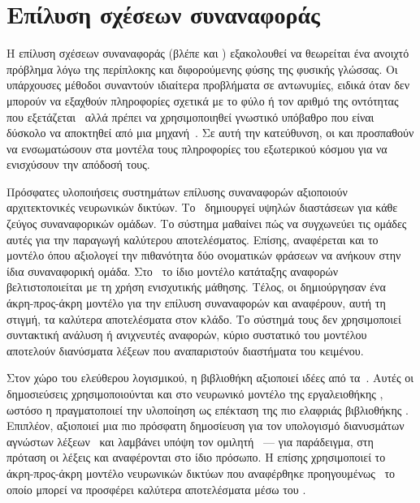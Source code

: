 \section{Επίλυση σχέσεων συναναφοράς}
Η επίλυση σχέσεων συναναφοράς (βλέπε και ) εξακολουθεί να θεωρείται ένα ανοιχτό πρόβλημα λόγω της περίπλοκης και διφορούμενης φύσης της φυσικής γλώσσας.
Οι υπάρχουσες μέθοδοι συναντούν ιδιαίτερα προβλήματα σε αντωνυμίες, ειδικά όταν δεν μπορούν να εξαχθούν πληροφορίες σχετικά με το φύλο ή τον αριθμό της οντότητας που εξετάζεται~\cite{peng2015solving} αλλά πρέπει να χρησιμοποιηθεί γνωστικό υπόβαθρο που είναι δύσκολο να αποκτηθεί από μια μηχανή~\cite{ng2017machine}.
Σε αυτή την κατεύθυνση, οι \citet{rahman2011coreference} και \citet{zhang2019incorporating} προσπαθούν να ενσωματώσουν στα μοντέλα τους πληροφορίες του εξωτερικού κόσμου για να ενισχύσουν την απόδοσή τους.

Πρόσφατες υλοποιήσεις συστημάτων επίλυσης συναναφορών αξιοποιούν αρχιτεκτονικές νευρωνικών δικτύων.
Το~\cite{CorefAnnotatorN1} δημιουργεί  υψηλών διαστάσεων για κάθε ζεύγος συναναφορικών ομάδων.
Το σύστημα μαθαίνει πώς να συγχωνεύει τις ομάδες αυτές για την παραγωγή καλύτερου αποτελέσματος.
Επίσης, αναφέρεται και το μοντέλο  όπου αξιολογεί την πιθανότητα δύο ονοματικών φράσεων να ανήκουν στην ίδια συναναφορική ομάδα.
Στο~\cite{CorefAnnotatorN2} το ίδιο μοντέλο κατάταξης αναφορών βελτιστοποιείται με τη χρήση ενισχυτικής μάθησης.
Τέλος, οι \citet{lee2017end} δημιούργησαν ένα άκρη-προς-άκρη μοντέλο για την επίλυση συναναφορών και αναφέρουν, αυτή τη στιγμή, τα καλύτερα αποτελέσματα στον κλάδο.
Το σύστημά τους δεν χρησιμοποιεί συντακτική ανάλυση ή ανιχνευτές αναφορών, κύριο συστατικό του μοντέλου αποτελούν διανύσματα λέξεων που αναπαριστούν διαστήματα του κειμένου.

Στον χώρο του ελεύθερου λογισμικού, η βιβλιοθήκη  αξιοποιεί ιδέες από τα~\cite{CorefAnnotatorN1,CorefAnnotatorN2}.
Αυτές οι δημοσιεύσεις χρησιμοποιούνται και στο νευρωνικό μοντέλο της εργαλειοθήκης ,
ωστόσο η  πραγματοποιεί την υλοποίηση ως επέκταση της πιο ελαφριάς βιβλιοθήκης .
Επιπλέον, αξιοποιεί μια πιο πρόσφατη δημοσίευση για τον υπολογισμό διανυσμάτων αγνώστων λέξεων~\cite{bahdanau2017learning}
και λαμβάνει υπόψη τον ομιλητή~\cite{raghunathan2010multi} ---
για παράδειγμα, στη πρόταση  οι λέξεις  και  αναφέρονται στο ίδιο πρόσωπο.
Η  επίσης χρησιμοποιεί το άκρη-προς-άκρη μοντέλο νευρωνικών δικτύων που αναφέρθηκε προηγουμένως~\cite{lee2017end} το οποίο μπορεί να προσφέρει καλύτερα αποτελέσματα μέσω του .

